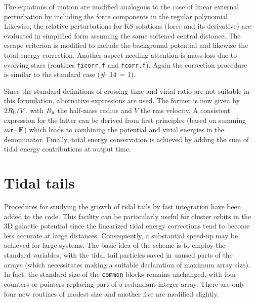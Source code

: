 \documentclass[12pt]{article}
\begin{document}
The equations of motion are modified analogous to the case of linear
external perturbation by including the force components in the regular
polynomial.
Likewise, the relative perturbations for KS solutions (force and its
derivative) are evaluated in simplified form assuming the same softened
central distance.
The escape criterion is modified to include the background potential
and likewise the total energy correction.
Another aspect needing attention is mass loss due to evolving stars
(routines {\tt ficorr.f} and {\tt fcorr.f}).
Again the correction procedure is similar to the standard case
(\#~14~= 1).

Since the standard definitions of crossing time and virial ratio are
not suitable in this formulation, alternative expressions are used.
The former is now given by $2 R_{\rm h}/V$, with $R_{\rm h}$ the
half-mass radius and $V$ the rms velocity.
A consistent expression for the latter can be derived from first principles
(based on summing $m {\bf r} \cdot {\bf F}$) which leads to combining the
potential and virial energies in the denominator.
Finally, total energy conservation is achieved by adding the sum of tidal
energy contributions at output time.

\section{Tidal tails}

Procedures for studying the growth of tidal tails by fast integration have
been added to the code.
This facility can be particularly useful for cluster orbits in the 3D
galactic potential since the linearized tidal energy corrections tend to
become less accurate at large distances.
Consequently, a substantial speed-up may be achieved for large systems.
The basic idea of the scheme is to employ the standard variables, with
the tidal tail particles saved in unused parts of the arrays (which
necessitates making a suitable declaration of maximum array size).
In fact, the standard size of the {\tt common} blocks remains unchanged,
with four counters or pointers replacing part of a redundant integer array.
There are only four new routines of modest size and another five are
modified slightly.
\end{document}

